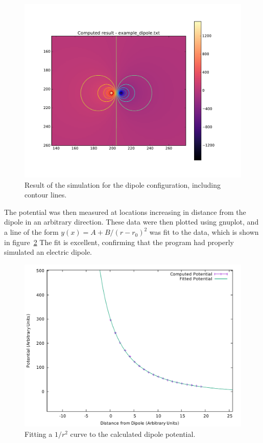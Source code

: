 \begin{figure}[h]
	\centering
	\center
	\includegraphics[width=1.1\linewidth]{dipole_contours.pdf}
	\caption{Result of the simulation for the dipole configuration, including contour lines.} \label{fig:dipole-cont}
	\end{figure}

The potential was then measured at locations increasing in distance from the dipole in an arbitrary direction.
These data were then plotted using gnuplot, and a line of the form $y(x) = A + B / (r-r_0)^2$ was fit to the
data, which is shown in figure~\ref{fig:dipole-fit} The fit is excellent, confirming that the program had properly simulated an electric dipole.

	\begin{figure}[h]
		\centering
	\includegraphics[width=\linewidth]{dipole_fit.pdf}
	\caption{Fitting a $1/r^2$ curve to the calculated dipole potential.} \label{fig:dipole-fit}
	\end{figure}

